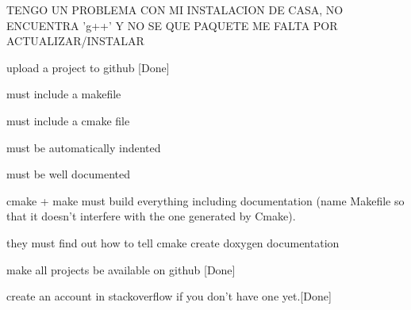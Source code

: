 T\-E\-N\-G\-O U\-N P\-R\-O\-B\-L\-E\-M\-A C\-O\-N M\-I I\-N\-S\-T\-A\-L\-A\-C\-I\-O\-N D\-E C\-A\-S\-A, N\-O E\-N\-C\-U\-E\-N\-T\-R\-A 'g++' Y N\-O S\-E Q\-U\-E P\-A\-Q\-U\-E\-T\-E M\-E F\-A\-L\-T\-A P\-O\-R A\-C\-T\-U\-A\-L\-I\-Z\-A\-R/\-I\-N\-S\-T\-A\-L\-A\-R
\begin{DoxyItemize}
\item upload a project to github \mbox{[}Done\mbox{]}
\item must include a makefile
\item must include a cmake file
\item must be automatically indented
\item must be well documented
\item cmake + make must build everything including documentation (name Makefile so that it doesn't interfere with the one generated by Cmake).
\item they must find out how to tell cmake create doxygen documentation
\item make all projects be available on github \mbox{[}Done\mbox{]}
\item create an account in stackoverflow if you don't have one yet.\mbox{[}Done\mbox{]} 
\end{DoxyItemize}